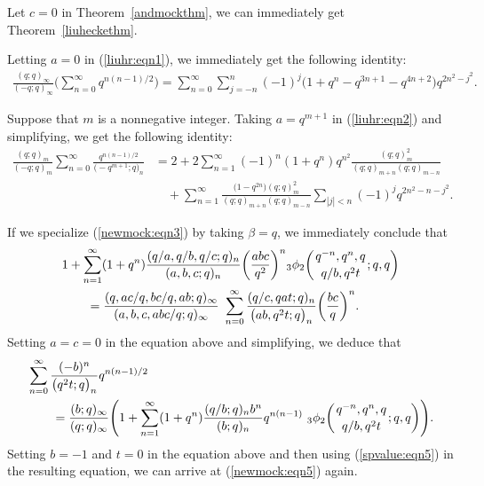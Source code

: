\documentclass[10pt,a4paper]{amsart}
\numberwithin{equation}{section}
\begin{document}
Let $c=0$ in Theorem~\ref{andmockthm}, we can immediately get Theorem~\ref{liuheckethm}.

Letting $a=0$ in (\ref{liuhr:eqn1}), we immediately get the following identity:
\begin{align}\label{newmock:eqn5}
	\frac{(q; q)_\infty}{(-q; q)_\infty}
	\Biggl(\sum_{n=0}^\infty q^{n(n-1)/2}\Biggr)
	=\sum_{n=0}^\infty \sum_{j=-n}^n (-1)^{j}\bigl(1+q^n-q^{3n+1}-q^{4n+2}\bigr) q^{2n^2-j^2}.
\end{align}

Suppose that $m$ is a nonnegative integer. Taking $a=q^{m+1}$ in (\ref{liuhr:eqn2}) and simplifying, we get the following identity:
\begin{align*}%
	\frac{(q; q)_m}{(-q; q)_m}\sum_{n=0}^\infty \frac{q^{n(n-1)/2}}{\bigl(-q^{m+1}; q\bigr)_n}
	&{}=2+2\sum_{n=1}^\infty (-1)^n (1+q^n) q^{n^2}\frac{(q; q)^2_m}{(q; q)_{m+n} (q; q)_{m-n}}\\
	&\quad{} +\sum_{n=1}^\infty \frac{\bigl(1-q^{2n}\bigr) (q; q)^2_m}{(q; q)_{m+n} (q; q)_{m-n}} \sum_{|j|<n} (-1)^j q^{2n^2-n-j^2}. \nonumber
\end{align*}

If we specialize (\ref{newmock:eqn3}) by taking $\beta=q$, we immediately conclude that
\begin{align}
		&1+\sum_{n=1}^\infty (1+q^n) \frac{(q/a, q/b, q/c; q)_n}{(a, b, c; q)_n} \biggl(\frac{abc}{q^2}\biggr)^n {_3\phi_2}\biggl({{q^{-n}, q^n, q}\atop{q/b, q^2 t}}; q, q\biggr)\nonumber\\
		&\qquad{}=\frac{(q, ac/q, bc/q, ab; q)_\infty}{(a, b, c, abc/q; q)_\infty}~
		\sum_{n=0}^{\infty}\frac{(q/c, qat; q)_n}{\bigl(ab, q^2t; q\bigr)_n}\biggl(\frac{bc}{q}\biggr)^n.\label{newmock:eqn7}
	\end{align}	
Setting $a=c=0$ in the equation above and simplifying, we deduce that
\begin{align}
&\sum_{n=0}^{\infty}\frac{(-b)^n}{\bigl(q^2t; q\bigr)_n} q^{n(n-1)/2}\nonumber\\
&\qquad{}=\frac{(b; q)_\infty} {(q; q)_\infty}
\Biggl(1+\sum_{n=1}^{\infty} (1+q^n) \frac{(q/b; q)_n b^n}{(b; q)_n} q^{n(n-1)}~{_3\phi_2}\biggl({{q^{-n}, q^n, q}\atop{q/b, q^2 t}}; q, q\biggr)\Biggr).
\label{newmock:eqn8}
\end{align}
Setting $b=-1$ and $t=0$ in the equation above and then using (\ref{spvalue:eqn5}) in the resulting equation, we can arrive at (\ref{newmock:eqn5}) again.
\end{document}
